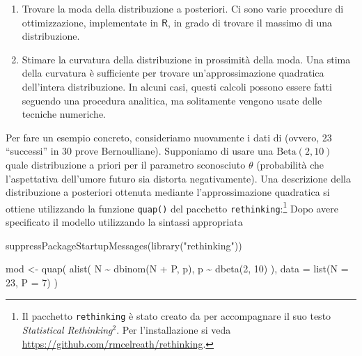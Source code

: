 \documentclass[
  11pt,
]{krantz}
\makeatletter
\newenvironment{Shaded}{\begin{snugshade}}{\end{snugshade}}
\newcommand{\AttributeTok}[1]{\textcolor[rgb]{0.61,0.61,0.61}{#1}}
\newcommand{\DecValTok}[1]{\textcolor[rgb]{0.06,0.06,0.06}{#1}}
\newcommand{\FunctionTok}[1]{\textcolor[rgb]{0,0,0}{#1}}
\newcommand{\NormalTok}[1]{#1}
\newcommand{\OtherTok}[1]{\textcolor[rgb]{0.37,0.37,0.37}{#1}}
\newcommand{\SpecialCharTok}[1]{\textcolor[rgb]{0,0,0}{#1}}
\newcommand{\StringTok}[1]{\textcolor[rgb]{0.5,0.5,0.5}{#1}}
\providecommand{\tightlist}{%
  \setlength{\itemsep}{0pt}\setlength{\parskip}{0pt}}
\newenvironment{kframe}{%
\medskip{}
\setlength{\fboxsep}{.8em}
 \def\at@end@of@kframe{}%
 \ifinner\ifhmode%
  \def\at@end@of@kframe{\end{minipage}}%
  \begin{minipage}{\columnwidth}%
 \fi\fi%
 \def\FrameCommand##1{\hskip\@totalleftmargin \hskip-\fboxsep
 \colorbox{shadecolor}{##1}\hskip-\fboxsep
     \hskip-\linewidth \hskip-\@totalleftmargin \hskip\columnwidth}%
 \MakeFramed {\advance\hsize-\width
   \@totalleftmargin\z@ \linewidth\hsize
   \@setminipage}}%
 {\par\unskip\endMakeFramed%
 \at@end@of@kframe}
\renewenvironment{Shaded}{\begin{kframe}}{\end{kframe}}
\newcommand{\R}{\textsf{R}} %
\theoremstyle{definition}
\theoremstyle{definition}
\theoremstyle{definition}
\theoremstyle{definition}
\theoremstyle{remark}
\makeatother
\begin{document}
\begin{enumerate}
\def\labelenumi{\arabic{enumi}.}
\tightlist
\item
  Trovare la moda della distribuzione a posteriori. Ci sono varie procedure di ottimizzazione, implementate in \(\R\), in grado di trovare il massimo di una distribuzione.
\item
  Stimare la curvatura della distribuzione in prossimità della moda. Una stima della curvatura è sufficiente per trovare un'approssimazione quadratica dell'intera distribuzione. In alcuni casi, questi calcoli possono essere fatti seguendo una procedura analitica, ma solitamente vengono usate delle tecniche numeriche.
\end{enumerate}

Per fare un esempio concreto, consideriamo nuovamente i dati di \citet{zetschefuture2019} (ovvero, 23 ``successi'' in 30 prove Bernoulliane). Supponiamo di usare una \(\mbox{Beta}(2, 10)\) quale distribuzione a priori per il parametro sconosciuto \(\theta\) (probabilità che l'aspettativa dell'umore futuro sia distorta negativamente). Una descrizione della distribuzione a posteriori ottenuta mediante l'approssimazione quadratica si ottiene utilizzando la funzione \texttt{quap()} del pacchetto \texttt{rethinking}:\footnote{Il pacchetto \texttt{rethinking} è stato creato da \citet{McElreath_rethinking} per accompagnare il suo testo \emph{Statistical Rethinking}\(^2\). Per l'installazione si veda \url{https://github.com/rmcelreath/rethinking}.} Dopo avere specificato il modello utilizzando la sintassi appropriata

\begin{Shaded}
\begin{Highlighting}[]
\FunctionTok{suppressPackageStartupMessages}\NormalTok{(}\FunctionTok{library}\NormalTok{(}\StringTok{"rethinking"}\NormalTok{))}

\NormalTok{mod }\OtherTok{\textless{}{-}} \FunctionTok{quap}\NormalTok{(}
  \FunctionTok{alist}\NormalTok{(}
\NormalTok{  N }\SpecialCharTok{\textasciitilde{}} \FunctionTok{dbinom}\NormalTok{(N }\SpecialCharTok{+}\NormalTok{ P, p),}
\NormalTok{  p }\SpecialCharTok{\textasciitilde{}} \FunctionTok{dbeta}\NormalTok{(}\DecValTok{2}\NormalTok{, }\DecValTok{10}\NormalTok{) }
\NormalTok{  ),}
  \AttributeTok{data =} \FunctionTok{list}\NormalTok{(}\AttributeTok{N =} \DecValTok{23}\NormalTok{, }\AttributeTok{P =} \DecValTok{7}\NormalTok{)}
\NormalTok{)}
\end{Highlighting}
\end{Shaded}
\end{document}

